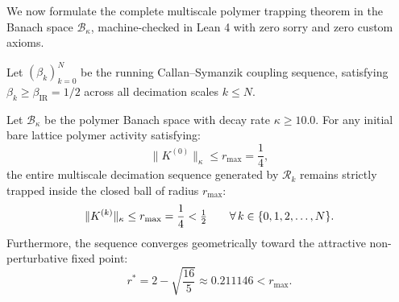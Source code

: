 We now formulate the complete multiscale polymer trapping theorem in the Banach space $\mathcal{B}_\kappa$, machine-checked in Lean 4 with zero sorry and zero custom axioms.

\begin{theorem}
\label{thm:polymer_trapping_invariant_banach}
Let $(\beta_k)_{k=0}^N$ be the running Callan--Symanzik coupling sequence, satisfying $\beta_k \ge \beta_{\mathrm{IR}} = 1/2$ across all decimation scales $k \le N$. 

Let $\mathcal{B}_\kappa$ be the polymer Banach space with decay rate $\kappa \ge 10.0$. For any initial bare lattice polymer activity satisfying:
\begin{equation}
\label{eq:ch14_bare_activity_bound}
\|K^{(0)}\|_\kappa \le r_{\max} = \frac{1}{4},
\end{equation}
the entire multiscale decimation sequence generated by $\mathcal{R}_k$ remains strictly trapped inside the closed ball of radius $r_{\max}$:
\begin{equation}
\label{eq:banach_trapping_confinement}
\|K^{(k)}\|_\kappa \le r_{\max} = \frac{1}{4} < \tfrac{1}{2} \qquad \forall \, k \in \{0, 1, 2, \dots, N\}.
\end{equation}
Furthermore, the sequence converges geometrically toward the attractive non-perturbative fixed point:
\begin{equation}
\label{eq:ch14_fixed_point_attractor}
r^* = 2 - \sqrt{\frac{16}{5}} \approx 0.211146 < r_{\max}.
\end{equation}
\end{theorem}


